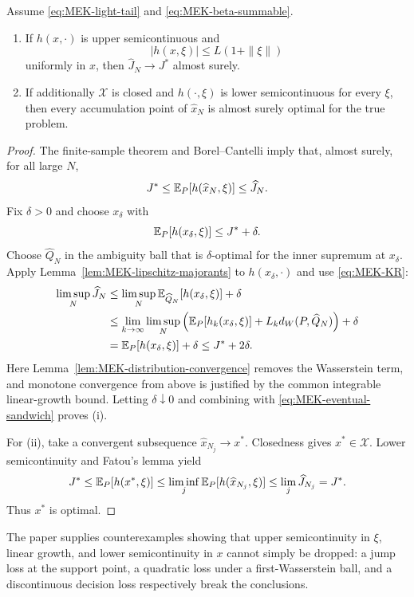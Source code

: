 \begin{theorem}\label{thm:MEK-consistency}
Assume \eqref{eq:MEK-light-tail} and \eqref{eq:MEK-beta-summable}.
\begin{enumerate}[label=(\roman*),leftmargin=2em]
\item If $h(x,\cdot)$ is upper semicontinuous and
\[
 |h(x,\xi)|\le L(1+\|\xi\|)
\]
uniformly in $x$, then $\widehat J_N\to J^*$ almost surely.
\item If additionally $\mathcal X$ is closed and $h(\cdot,\xi)$ is lower semicontinuous for every $\xi$, then every accumulation point of $\widehat x_N$ is almost surely optimal for the true problem.
\end{enumerate}
\end{theorem}
\begin{proof}
The finite-sample theorem and Borel--Cantelli imply that, almost surely, for all large $N$,
\begin{equation}\label{eq:MEK-eventual-sandwich}
 J^*\le\mathbb{E}_P[h(\widehat x_N,\xi)]\le\widehat J_N.
\end{equation}
Fix $\delta>0$ and choose $x_\delta$ with
\[
 \mathbb{E}_P[h(x_\delta,\xi)]\le J^*+\delta.
\]
Choose $\widehat Q_N$ in the ambiguity ball that is $\delta$-optimal for the inner supremum at $x_\delta$.  Apply Lemma~\ref{lem:MEK-lipschitz-majorants} to $h(x_\delta,\cdot)$ and use \eqref{eq:MEK-KR}:
\begin{align*}
 \limsup_N\widehat J_N
 &\le\limsup_N\mathbb{E}_{\widehat Q_N}[h(x_\delta,\xi)]+\delta\\
 &\le\lim_{k\to\infty}\limsup_N
 \left(\mathbb{E}_P[h_k(x_\delta,\xi)]
 +L_kd_W(P,\widehat Q_N)\right)+\delta\\
 &=\mathbb{E}_P[h(x_\delta,\xi)]+\delta
 \le J^*+2\delta.
\end{align*}
Here Lemma~\ref{lem:MEK-distribution-convergence} removes the Wasserstein term, and monotone convergence from above is justified by the common integrable linear-growth bound.  Letting $\delta\downarrow0$ and combining with \eqref{eq:MEK-eventual-sandwich} proves (i).

For (ii), take a convergent subsequence $\widehat x_{N_j}\to x^*$.  Closedness gives $x^*\in\mathcal X$.  Lower semicontinuity and Fatou's lemma yield
\[
 J^*\le\mathbb{E}_P[h(x^*,\xi)]
 \le\liminf_j\mathbb{E}_P[h(\widehat x_{N_j},\xi)]
 \le\lim_j\widehat J_{N_j}=J^*.
\]
Thus $x^*$ is optimal.
\end{proof}

The paper supplies counterexamples showing that upper semicontinuity in $\xi$, linear growth, and lower semicontinuity in $x$ cannot simply be dropped: a jump loss at the support point, a quadratic loss under a first-Wasserstein ball, and a discontinuous decision loss respectively break the conclusions.

